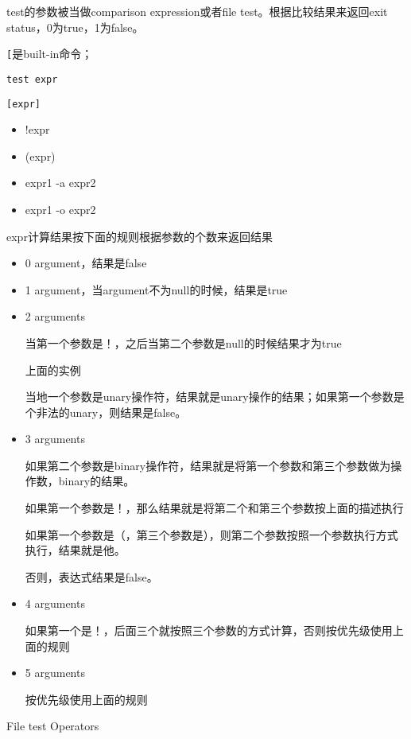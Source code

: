 test的参数被当做comparison expression或者file test。根据比较结果来返回exit status，0为true，1为false。

\lstinline$[$是built-in命令；

\lstinline$test expr$

\lstinline$[expr]$

\begin{itemize}
\item !expr
\item (expr)
\item expr1 -a expr2
\item expr1 -o expr2 
\end{itemize}

expr计算结果按下面的规则根据参数的个数来返回结果
\begin{itemize}
\item 0 argument，结果是false
\item 1 argument，当argument不为null的时候，结果是true
\item 2 arguments

当第一个参数是！，之后当第二个参数是null的时候结果才为true

\begin{Command-Line}

上面的实例

\end{Command-Line}

当地一个参数是unary操作符，结果就是unary操作的结果；如果第一个参数是个非法的unary，则结果是false。


\item 3 arguments 

如果第二个参数是binary操作符，结果就是将第一个参数和第三个参数做为操作数，binary的结果。

如果第一个参数是！，那么结果就是将第二个和第三个参数按上面的描述执行

如果第一个参数是（，第三个参数是），则第二个参数按照一个参数执行方式执行，结果就是他。

否则，表达式结果是false。

\item 4 arguments

如果第一个是！，后面三个就按照三个参数的方式计算，否则按优先级使用上面的规则

\item 5 arguments

按优先级使用上面的规则

\end{itemize} 


File test Operators

